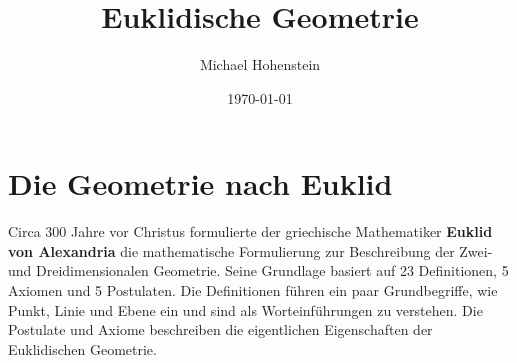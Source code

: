 \documentclass[a4paper]{article}
\title{Euklidische Geometrie}
\author{Michael Hohenstein}
\date{\today}
\begin{document}
	\maketitle
	\newpage

	\section{Die Geometrie nach Euklid}

	Circa 300 Jahre vor Christus formulierte der griechische Mathematiker \textbf{Euklid von Alexandria} die mathematische Formulierung zur Beschreibung der Zwei- und Dreidimensionalen Geometrie. Seine Grundlage basiert auf 23 Definitionen, 5 Axiomen und 5 Postulaten. Die Definitionen führen ein paar Grundbegriffe, wie Punkt, Linie und Ebene ein und sind als Worteinführungen zu verstehen. Die Postulate und Axiome beschreiben die eigentlichen Eigenschaften der Euklidischen Geometrie.
\end{document}
